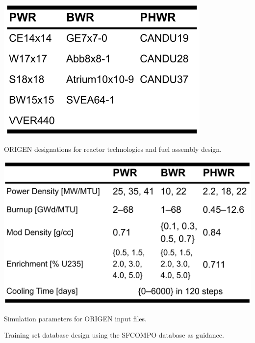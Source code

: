\begin{table}[!h]
  \centering
  \begin{subtable}{\linewidth}
    \centering
    \includegraphics[width=0.55\linewidth]{./chapters/method/trainset4_Orxtrs.png}
    \caption{\gls{ORIGEN} designations for reactor technologies and fuel assembly design.}
    \label{tbl:rxtrtype}
    \vspace*{5mm}
  \end{subtable}
  \begin{subtable}{\linewidth}
    \centering
    \includegraphics[width=0.8\linewidth]{./chapters/method/trainset4_inputs.png}
    \caption{Simulation parameters for \gls{ORIGEN} input files.}
    \label{tbl:rxtrparam}
  \end{subtable}%
  \caption{Training set database design using the \gls{SFCOMPO} database as guidance.}
  \label{tbl:train}
\end{table}

